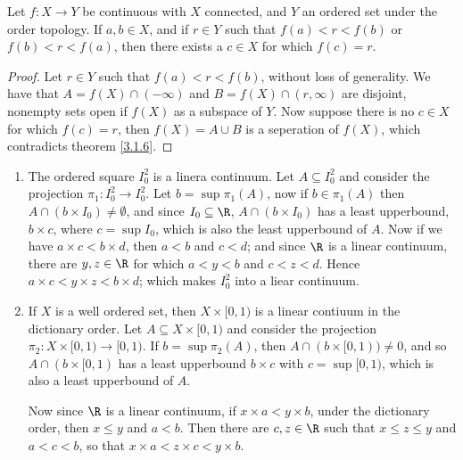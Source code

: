 \begin{theorem}\label{3.2.2}
    Let $f:X \rightarrow Y$ be continuous with  $X$ connected, and  $Y$ an ordered set under the
    order topology. If  $a,b \in X$, and if  $r \in Y$ such that  $f(a)<r<f(b)$ or $f(b)<r<f(a)$,
    then there exists a $c \in X$ for which  $f(c)=r$.
\end{theorem}
\begin{proof}
    Let $r \in Y$ such that  $f(a)<r<f(b)$, without loss of generality. We have that $A=f(X) \cap
    (-\infty)$ and $B=f(X) \cap (r ,\infty)$ are disjoint, nonempty sets open if $f(X)$ as a
    subspace of $Y$. Now suppose there is no  $c \in X$ for which  $f(c)=r$, then $f(X)=A \cup B$ is
    a seperation of $f(X)$, which contradicts theorem \ref{3.1.6}.
\end{proof}

\begin{example}
    \begin{enumerate}[label=(\arabic*)]
        \item The ordered square $I_0^2$ is a linera continuum. Let $A \subseteq I_0^2$ and consider
            the projection $\pi_1:I_0^2 \rightarrow I_0^2$. Let $b=\sup{\pi_1(A)}$, now if $b \in
            \pi_1(A)$ then $A \cap (b \times I_0) \neq \emptyset$, and since $I_0 \subseteq \R$, $A
            \cap (b \times I_0)$ has a least upperbound, $b \times c$, where  $c=\sup{I_0}$, which
            is also the least upperbound of $A$. Now if we have $a \times c < b \times d$, then
            $a<b$ and  $c<d$; and since  $\R$ is a linear continuum, there are $y,z \in \R$ for
            which  $a<y<b$ and  $c<z<d$. Hence  $a \times c < y \times z < b \times d$; which makes
            $ I_0^2$ into a liear continuum.

        \item If $X$ is a well ordered set, then  $X \times [0,1)$ is a linear contiuum in the
            dictionary order. Let $A \subseteq X \times [0,1)$ and consider the projection $\pi_2:X
            \times [0,1) \rightarrow [0,1)$. If $b=\sup{\pi_2(A)}$, then $A \cap (b \times [0,1)) \neq
            0$, and so $A \cap (b \times [0,1)$ has a least upperbound $b \times c$ with
            $c=\sup{[0,1)}$, which is also a least upperbound of $A$.

            Now since $\R$ is a linear continuum, if $x \times a < y \times b$, under the dictionary
            order, then  $x \leq y$ and  $a<b$. Then there are  $c,z \in \R$ such that  $x \leq z
            \leq y$ and  $a<c<b$, so that $x \times a < z \times c < y \times b$.
    \end{enumerate}
\end{example} 

